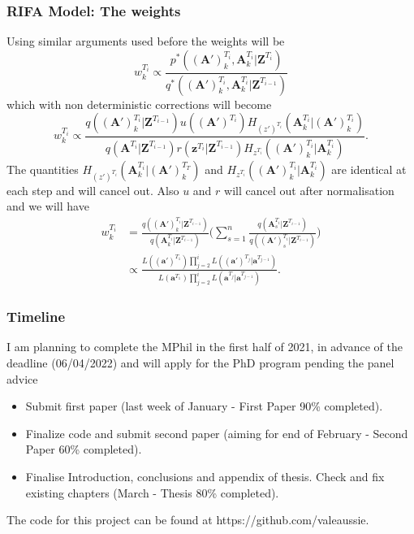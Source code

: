 \documentclass[9pt, xcolor={dvipsnames,svgnames,table}]{beamer}
\begin{document}
\begin{frame}
    \frametitle{RIFA Model: The weights}
    Using similar arguments used before the weights will be
    \begin{equation*}
        w^{T_i}_k \propto \frac{p^*(\bm{(A')}^{T_i}_k, \bm{A}^{T_i}_k | \bm{Z}^{T_i})} {q^*(\bm{(A')}^{T_i}_k, \bm{A}^{T_i}_k | \bm{Z}^{T_{i-1}})}
    \end{equation*}
    which with non deterministic corrections will become
    \begin{equation*}
        w^{T_i}_k \propto \frac{q(\bm{(A')}^{T_i}_k | \bm{Z}^{T_{i-1}}) u(\bm{(A')}^{T_i}) H_{(z')^{T_i}} (\bm{A}^{T_i}_k | \bm{(A')}^{T_i}_k)}{q(\bm{A}^{T_i} | \bm{Z}^{T_{i-1}}) r(\bm{z}^{T_i}| \bm{Z}^{T_{i-1}})  H_{z^{T_i}} (\bm{(A')}^{T_i}_k | \bm{A}^{T_i}_k)}.
    \end{equation*}
    The quantities $H_{(z')^{T_i}} (\bm{A}^{T_i}_k | \bm{(A')}^{T_T}_k)$ and $H_{z^{T_i}} (\bm{(A')}^{T_i}_k | \bm{A}^{T_i}_k)$ are identical at each step and will cancel out. Also $u$ and $r$ will cancel out after normalisation and we will have
    \begin{equation*}
        \begin{aligned}
            w^{T_i}_k & = \frac{q(\bm{(A')}^{T_i}_k | \bm{Z}^{T_{i-1}})}{q(\bm{A}^{T_i}_k | \bm{Z}^{T_{i-1}})} \Bigg( \sum_{s=1}^n \frac{q(\bm{A}^{T_i}_s | \bm{Z}^{T_{i-1}})}{q(\bm{(A')}^{T_i}_s | \bm{Z}^{T_{i-1}})} \Bigg)\\
            & \propto \frac{L((\bm{a}')^{T_1})\prod_{j=2}^{i} L((\bm{a}')^{T_j} | \bm{a}^{T_{j-1}})}{L(\bm{a}^{T_1})\prod_{j=2}^{i} L(\bm{a}^{T_j} | \bm{a}^{T_{j-1}})}.
        \end{aligned}
    \end{equation*}
\end{frame}






\begin{frame}
\frametitle{Timeline}
    I am planning to complete the MPhil in the first half of 2021, in advance of the deadline (06/04/2022) and will apply for the PhD program pending the panel advice
    \begin{itemize}
    \setlength\itemsep{1em}
        \item Submit first paper (last week of January - First Paper 90\% completed).
        \item Finalize code and submit second paper (aiming for end of February - Second Paper 60\% completed).
        \item Finalise Introduction, conclusions and appendix of thesis. Check and fix existing chapters (March - Thesis 80\% completed).
    \end{itemize}
    The code for this project can be found at https://github.com/valeaussie.
\end{frame}
\end{document}

